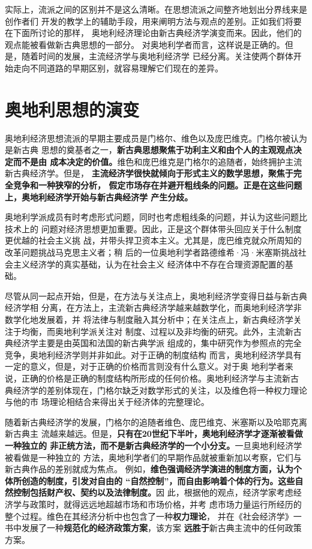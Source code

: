 实际上，流派之间的区别并不是这么清晰。在思想流派之间整齐地划出分界线来是创作者们
开发的教学上的辅助手段，用来阐明方法与观点的差别。正如我们将要在下面所讨论的那样，
奥地利经济理论由新古典经济学演变而来。因此，他们的观点能被看做新古典思想的一部分。
对奥地利学者而言，这样说是正确的。但是，随着时间的发展，主流经济学与奥地利经济学
已经分离。关注使两个群体开始走向不同道路的早期区别，就容易理解它们现在的差异。

\section{奥地利思想的演变}

奥地利经济思想流派的早期主要成员是门格尔、维色以及庞巴维克。门格尔被认为是新古典
思想的奠基者之一，\textbf{新古典思想聚焦于功利主义和由个人的主观观点决定而不是由
成本决定的价值。}维色和庞巴维克是门格尔的追随者，始终拥护主流新古典经济学。但是，
\textbf{主流经济学很快就倾向于形式主义的数学思想，聚焦于完全竞争和一种狭窄的分析，
假定市场存在并避开粗线条的问题。正是在这些问题上，奥地利经济学开始与新古典经济学
产生分歧。}

奥地利学派成员有时考虑形式问题，同时也考虑粗线条的问题，并认为这些问题比技术上的
问题对经济思想更加重要。因此，正是这个群体带头回应关于什么制度更优越的社会主义挑
战，并带头捍卫资本主义。尤其是，庞巴维克就众所周知的改革问题挑战马克思主义者；稍
后的一位奥地利学者路德维希·冯·米塞斯挑战社会主义经济学的真实基础，认为在社会主义
经济体中不存在合理资源配置的基础。

尽管从同一起点开始，但是，在方法与关注点上，奥地利经济学变得日益与新古典经济学相
分离，在方法上，主流新古典经济学越来越数学化，而奥地利经济学非数学化地发展着，并
将法律与制度融入其分析中；在关注点上，新古典经济学关注于均衡，而奥地利学派关注对
制度、过程以及非均衡的研究。此外，主流新古典经济学主要是由英国和法国的新古典学派
组成的，集中研究作为参照点的完全竞争，奥地利经济学则并非如此。对于正确的制度结构
而言，奥地利经济学具有一定的意义，但是，对于正确的价格而言则没有什么意义。对于奥
地利学者来说，正确的价格是正确的制度结构所形成的任何价格。奥地利经济学与主流新古
典经济学的差别体现在，门格尔缺乏对数学形式的关注，以及维色将一种权力理论与他的市
场理论相结合来得出关于经济体的完整理论。

随着新古典经济学的发展，门格尔的追随者维色、庞巴维克、米塞斯以及哈耶克离新古典主
流越来越远。但是，\textbf{只有在20世纪下半叶，奥地利经济学才逐渐被看做一种独立的
非正统方法，而不是新古典经济学的一个小分支。}一旦奥地利经济学被看做是一种独立的
方法，奥地利学者们的早期作品就被重新加以考察，它们与新古典作品的差别就成为焦点。
例如，\textbf{维色强调经济学演进的制度方面，认为个体所创造的制度，引发对自由的
“自然控制”，而自由影响着个体的行为。这些自然控制包括财产权、契约以及法律制度。}因
此，根据他的观点，经济学家考虑经济学与政策时，就得远远地超越市场和市场价格，并考
虑市场力量运行所经历的整个过程。维色在其经济分析中也包含了一种\textbf{权力理论}，
并在《社会经济学》一书中发展了一种\textbf{规范化的经济政策方案}，该方案
\textbf{远胜于}新古典主流中的任何政策方案。

